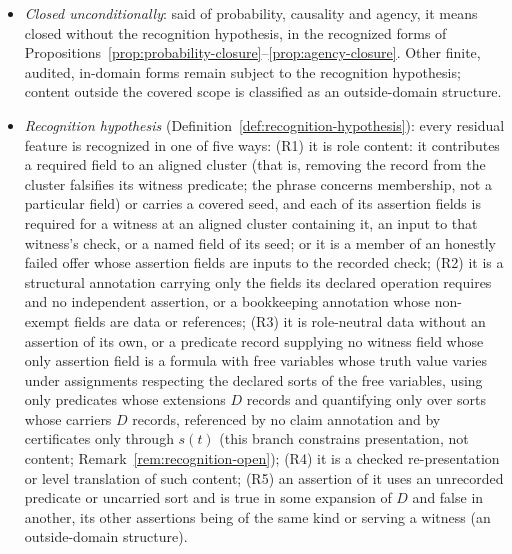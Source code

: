 \documentclass[11pt]{article}
\theoremstyle{definition}
\begin{document}
\begin{itemize}[topsep=2pt,itemsep=1pt]
    admissible projection is a derived role projection
    (Definition~\ref{def:role-projection}), whose cluster satisfies its
    witness schema \(W_i\), with the attachment data of
    Definition~\ref{def:threshold-attachment}; and an admissible role witness carries the common witness data of
    Definition~\ref{def:common-witness-data}. In
    Section~\ref{sec:integrated-stress}, a misreading is called excluded when it
    is not licensed by the results of
    Sections~\ref{sec:fatcd-domain}--\ref{sec:decomposition-exhaustion}.
  \item \emph{Closed unconditionally}: said of probability, causality and
    agency, it means closed without the recognition hypothesis, in the
    recognized forms of
    Propositions~\ref{prop:probability-closure}--\ref{prop:agency-closure}.
    Other finite, audited, in-domain forms remain subject to the
    recognition hypothesis; content outside the covered scope is
    classified as an outside-domain structure.
  \item \emph{Recognition hypothesis}
    (Definition~\ref{def:recognition-hypothesis}): every residual feature is
    recognized in one of five ways: (R1) it is role content: it contributes
    a required field to an aligned cluster (that is, removing the record from
    the cluster falsifies its witness predicate; the phrase concerns
    membership, not a particular field) or carries a covered seed, and
    each of its assertion fields is required for a witness at an aligned
    cluster containing it, an input to that witness's check, or a named
    field of its seed; or it is a member of an honestly failed offer whose
    assertion fields are inputs to the recorded check; (R2) it is a
    structural annotation carrying only the fields its declared operation
    requires and no independent assertion, or a bookkeeping annotation whose
    non-exempt fields are data or references; (R3) it is role-neutral data
    without an assertion of its own, or a predicate record supplying no witness field whose only assertion field is a formula with free variables whose truth value varies under assignments respecting the declared sorts of the free variables, using only predicates whose extensions \(D\) records and quantifying only over sorts whose carriers \(D\) records, referenced by no claim annotation and by certificates only through \(s(t)\) (this branch constrains presentation, not content; Remark~\ref{rem:recognition-open}); (R4) it is a checked re-presentation or
    level translation of such content; (R5) an assertion of it uses an unrecorded predicate or uncarried sort and is true in some expansion of \(D\) and false in another, its other assertions being of the same kind or serving a witness (an outside-domain structure).

\end{itemize}
\end{document}
